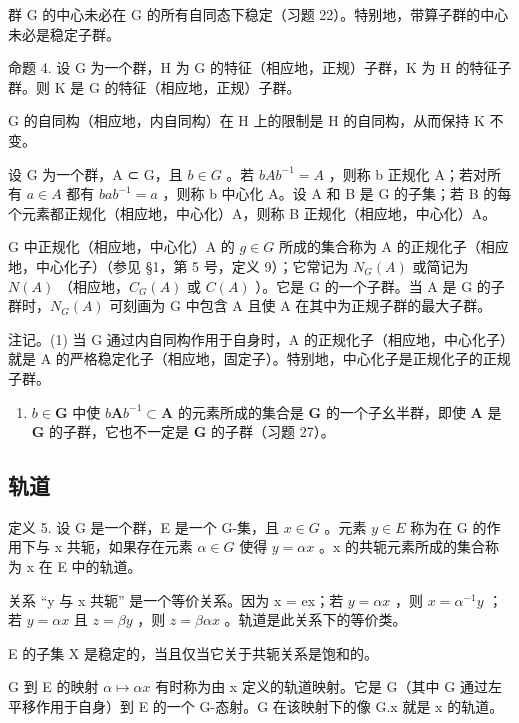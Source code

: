 群 G 的中心未必在 G 的所有自同态下稳定（习题 22）。特别地，带算子群的中心未必是稳定子群。

命题 4. 设 G 为一个群，H 为 G 的特征（相应地，正规）子群，K 为 H 的特征子群。则 K 是 G 的特征（相应地，正规）子群。

G 的自同构（相应地，内自同构）在 H 上的限制是 H 的自同构，从而保持 K 不变。

设 G 为一个群，A ⊂ G，且 \(b \in G\) 。若 \(bAb^{-1} = A\) ，则称 b 正规化 A；若对所有 \(a \in A\) 都有 \(bab^{-1} = a\) ，则称 b 中心化 A。设 A 和 B 是 G 的子集；若 B 的每个元素都正规化（相应地，中心化）A，则称 B 正规化（相应地，中心化）A。

G 中正规化（相应地，中心化）A 的 \(g \in G\) 所成的集合称为 A 的正规化子（相应地，中心化子）（参见 §1，第 5 号，定义 9）；它常记为 \(N_{G}(A)\) 或简记为 \(N(A)\) （相应地，\(C_{G}(A)\) 或 \(C(A)\) ）。它是 G 的一个子群。当 A 是 G 的子群时，\(N_{G}(A)\) 可刻画为 G 中包含 A 且使 A 在其中为正规子群的最大子群。

注记。(1) 当 G 通过内自同构作用于自身时，A 的正规化子（相应地，中心化子）就是 A 的严格稳定化子（相应地，固定子）。特别地，中心化子是正规化子的正规子群。

\begin{enumerate}
\def\labelenumi{(\arabic{enumi})}
\setcounter{enumi}{1}
\tightlist
\item
  \(b \in \mathbf{G}\) 中使 \(b\mathbf{A}b^{-1} \subset \mathbf{A}\) 的元素所成的集合是 \(\mathbf{G}\) 的一个子幺半群，即使 \(\mathbf{A}\) 是 \(\mathbf{G}\) 的子群，它也不一定是 \(\mathbf{G}\) 的子群（习题 27）。
\end{enumerate}

\subsection{轨道}

定义 5. 设 G 是一个群，E 是一个 G-集，且 \(x \in G\) 。元素 \(y \in E\) 称为在 G 的作用下与 x 共轭，如果存在元素 \(\alpha \in G\) 使得 \(y = \alpha x\) 。x 的共轭元素所成的集合称为 x 在 E 中的轨道。

关系 “y 与 x 共轭” 是一个等价关系。因为 x = ex；若 \(y = \alpha x\) ，则 \(x = \alpha^{-1} y\) ；若 \(y = \alpha x\) 且 \(z = \beta y\) ，则 \(z = \beta \alpha x\) 。轨道是此关系下的等价类。

E 的子集 X 是稳定的，当且仅当它关于共轭关系是饱和的。

G 到 E 的映射 \(\alpha\mapsto\alpha x\) 有时称为由 x 定义的轨道映射。它是 G（其中 G 通过左平移作用于自身）到 E 的一个 G-态射。G 在该映射下的像 G.x 就是 x 的轨道。

